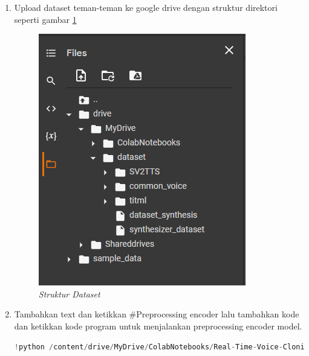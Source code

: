 \begin{enumerate}
\begin{lstlisting}[language=Python, caption=Preprocessing Encoder Model, label=lstencoder]
    # Preprocess the datasets
    print_args(args, parser)
    preprocess_func = {
      "titml": preprocess_speech_dataset,
      "common_voice": preprocess_clean_dataset, 
    }
    args = vars(args)
    for dataset in args.pop("datasets"):
        print("Preprocessing %s" % dataset)
        preprocess_func[dataset](**args)
\end{lstlisting}

Pada argument dataset masukkan nama dataset yang teman-teman gunakan, pada kode diatas saya menggunakan dataset titml dan common voice berbahasa indonesia.

\item Upload dataset teman-teman ke google drive dengan struktur direktori seperti gambar \ref{colab9}
\begin{figure}[H]
    \centering
    \includegraphics[scale=0.75]{figures/colab9}
    \caption{\textit{Struktur Dataset}}
    \label{colab9}
\end{figure}

\item Tambahkan text dan ketikkan \#Preprocessing encoder lalu tambahkan kode dan ketikkan kode program untuk menjalankan preprocessing encoder model.

\begin{lstlisting}[language=Python, caption=Script to Run Preprocessing Speaker Encoder Model]
!python /content/drive/MyDrive/ColabNotebooks/Real-Time-Voice-Cloning/encoder_preprocess.py /content/drive/MyDrive/dataset
\end{lstlisting}


\end{enumerate}
